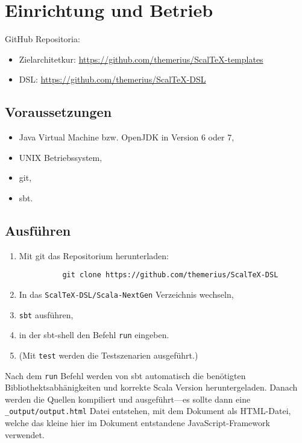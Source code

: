 \chapter{Einrichtung und Betrieb}

GitHub Repositoria:

\begin{itemize}
  \item Zielarchitetkur: \url{https://github.com/themerius/ScalTeX-templates}
  \item DSL: \url{https://github.com/themerius/ScalTeX-DSL}
\end{itemize}

\section{Voraussetzungen}

\begin{itemize}
  \item Java Virtual Machine bzw. OpenJDK in Version 6 oder 7,
  \item UNIX Betriebssystem,
  \item git,
  \item sbt.
\end{itemize}

\section{Ausführen}

\begin{enumerate}
  \item Mit git das Repositorium herunterladen:
        \begin{verbatim}
          git clone https://github.com/themerius/ScalTeX-DSL
        \end{verbatim}
  \item In das \verb+ScalTeX-DSL/Scala-NextGen+ Verzeichnis wechseln,
  \item \verb+sbt+ ausführen,
  \item in der sbt-shell den Befehl \verb+run+ eingeben.
  \item (Mit \verb+test+ werden die Testszenarien ausgeführt.)
\end{enumerate}

Nach dem \verb+run+ Befehl werden von sbt automatisch die benötigten
Bibliothektsabhänigkeiten und korrekte Scala Version heruntergeladen.
Danach werden die Quellen kompiliert und ausgeführt---es sollte dann eine
\verb+_output/output.html+ Datei entstehen, mit dem Dokument als HTML-Datei,
welche das kleine hier im Dokument entstandene JavaScript-Framework verwendet.

